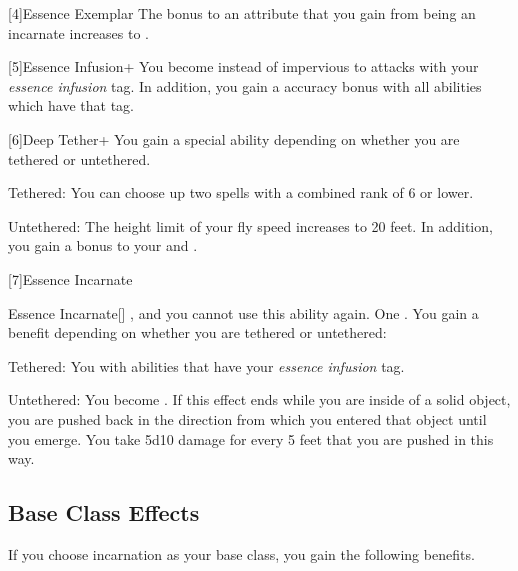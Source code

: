     [4]{Essence Exemplar} The bonus to an attribute that you gain from being an incarnate increases to .

    [5]{Essence Infusion+} You become  instead of impervious to attacks with your \textit{essence infusion} tag.
      In addition, you gain a  accuracy bonus with all abilities which have that tag.

    [6]{Deep Tether+} You gain a special ability depending on whether you are tethered or untethered.
      \begin{raggeditemize}
        \item Tethered: You can choose up two spells with a combined rank of 6 or lower.
        \item Untethered: The height limit of your fly speed increases to 20 feet.
          In addition, you gain a  bonus to your  and .
      \end{raggeditemize}

    [7]{Essence Incarnate}
      \begin{magicalactiveability}{Essence Incarnate}[]
        \abilityusagetime {}, and you  cannot use this ability again.
        \abilitycost One .
        \rankline
        You gain a benefit depending on whether you are tethered or untethered:
        \begin{raggeditemize}
          \item Tethered: You  \primed with abilities that have your \textit{essence infusion} tag.
          \item Untethered: You  become .
            If this effect ends while you are inside of a solid object, you are pushed back in the direction from which you entered that object until you emerge.
            You take 5d10 damage for every 5 feet that you are pushed in this way.
        \end{raggeditemize}

        {}
      \end{magicalactiveability}

  \subsection{Base Class Effects}
    If you choose incarnation as your base class, you gain the following benefits.

